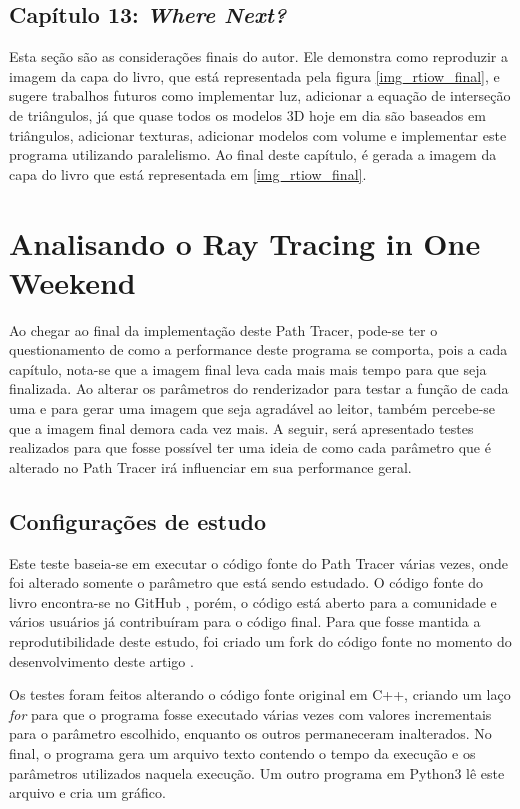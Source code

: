 \documentclass[journal]{IEEEtran}
\begin{document}
\subsection*{Capítulo 13: \emph{Where Next?}}
Esta seção são as considerações finais do autor. Ele demonstra como reproduzir a imagem da capa do livro, que
está representada pela figura \ref{img_rtiow_final}, e sugere trabalhos futuros como implementar luz, adicionar
a equação de interseção de triângulos, já que quase todos os modelos 3D hoje em dia são baseados em triângulos,
adicionar texturas, adicionar modelos com volume e implementar este programa utilizando paralelismo.
Ao final deste capítulo, é gerada a imagem da capa do livro que está representada em \ref{img_rtiow_final}.

\section{Analisando o Ray Tracing in One Weekend}
Ao chegar ao final da implementação deste Path Tracer, pode-se ter o questionamento de como a performance
deste programa se comporta, pois a cada capítulo, nota-se que a imagem final leva cada mais mais tempo para
que seja finalizada. Ao alterar os parâmetros do renderizador para testar a função de cada uma e para gerar
uma imagem que seja agradável ao leitor, também percebe-se que a imagem final demora cada vez mais. A seguir,
será apresentado testes realizados para que fosse possível ter uma ideia de como cada parâmetro que é alterado
no Path Tracer irá influenciar em sua performance geral.

\subsection{Configurações de estudo}
Este teste baseia-se em executar o código fonte do Path Tracer várias vezes, onde foi alterado somente o 
parâmetro que está sendo estudado. O código fonte do livro encontra-se no GitHub \cite{RayTracinOneWeekend-GitHub},
porém, o código está aberto para a comunidade e vários usuários já contribuíram para o código final. Para
que fosse mantida a reprodutibilidade deste estudo, foi criado um fork do código fonte no momento do
desenvolvimento deste artigo \cite{RayTracinOneWeekend-Artigo}.

Os testes foram feitos alterando o código fonte original em C++, criando um laço \emph{for} para que o programa
fosse executado várias vezes com valores incrementais para o parâmetro escolhido, enquanto os outros
permaneceram inalterados. No final, o programa gera um arquivo texto contendo o tempo da execução e os
parâmetros utilizados naquela execução. Um outro programa em Python3 lê este arquivo e cria um gráfico.
\end{document}

